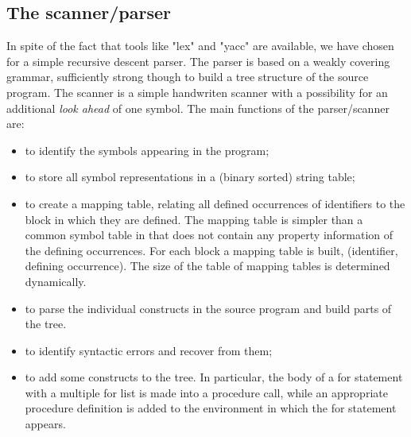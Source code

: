 \documentclass[11pt]{article}
\begin{document}
\subsection{The scanner/parser}
In spite of the fact that tools like "lex" and "yacc" are available, we have chosen
for a simple recursive descent parser. 
The parser is based on a weakly covering grammar, sufficiently strong though
to build a tree structure of the source program. 
The scanner is a simple handwriten scanner with a possibility for an
additional {\em look ahead} of one symbol.
The main functions of the parser/scanner are:
\begin{itemize}
\item to identify the symbols appearing in the program;
\item to store all symbol representations in a (binary sorted) string table;
\item to create a mapping table, relating all defined occurrences of identifiers
to the block in which they are defined. The mapping table is simpler than a
common symbol table in that does not contain any property information
of the defining occurrences.
For each block a mapping table is built, (identifier, defining occurrence).
The size of the table of mapping tables is determined dynamically.
\item to parse the individual constructs in the source program and build
parts of the tree.
\item to identify syntactic errors and recover from them;
\item to add some constructs to the tree. In particular, the body of
a for statement with a multiple for list is made into a procedure call, while
an appropriate procedure definition is added to the environment in
which the for statement appears.
\end{itemize}
\end{document}
